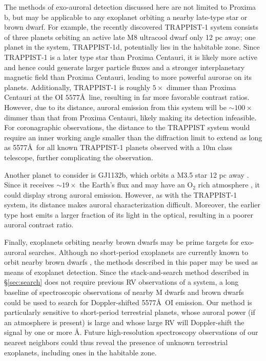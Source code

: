 \documentclass[apjl]{emulateapj}
\begin{document}
The methods of exo-auroral detection discussed here are not limited to Proxima b, but may be applicable to any exoplanet orbiting a nearby late-type star or brown dwarf.  For example, the recently discovered TRAPPIST-1 system \citep{Gillon2016} consists of three planets orbiting an active late M8 ultracool dwarf only 12 pc away; one planet in the system, TRAPPIST-1d, potentially lies in the habitable zone. Since TRAPPIST-1 is a later type star than Proxima Centauri, it is likely more active \citep[e.g.,][]{West2008} and hence could generate larger particle fluxes and a stronger interplanetary magnetic field than Proxima Centauri, leading to more powerful aurorae on its planets. Additionally, TRAPPIST-1 is roughly $5\times$ dimmer than Proxima Centauri at the OI $5577$\AA\ line, resulting in far more favorable contrast ratios. However, due to its distance, auroral emission from this system will be $\sim 100\times$ dimmer than that from Proxima Centauri, likely making its detection infeasible. For coronagraphic observations, the distance to the TRAPPIST system would require an inner working angle smaller than the diffraction limit to extend as long as 5577\AA\ for all known TRAPPIST-1 planets observed with a 10m class telescope, further complicating the observation.

Another planet to consider is GJ1132b, which orbits a M3.5 star 12 pc away \citep{Berta2015}. Since it receives $\sim 19\times$ the Earth's flux and may have an O$_2$ rich atmosphere \citep{Schaefer2016}, it could display strong auroral emission. However, as with the TRAPPIST-1 system, its distance makes auroral characterization difficult. Moreover, the earlier type host emits a larger fraction of its light in the optical, resulting in a poorer auroral contrast ratio.

Finally, exoplanets orbiting nearby brown dwarfs may be prime targets for exo-auroral searches. Although no short-period exoplanets are currently known to orbit nearby brown dwarfs \citep{He2016}, the methods described in this paper may be used as means of exoplanet detection. Since the stack-and-search method described in \S\ref{sec:search} does not require previous RV observations of a system, a long baseline of spectroscopic observations of nearby M dwarfs and brown dwarfs could be used to search for Doppler-shifted 5577\AA\ OI emission. Our method is particularly sensitive to short-period terrestrial planets, whose auroral power (if an atmosphere is present) is large and whose large RV will Doppler-shift the signal by one or more \AA. Future high-resolution spectroscopy observations of our nearest neighbors could thus reveal the presence of unknown terrestrial exoplanets, including ones in the habitable zone.
\end{document}
